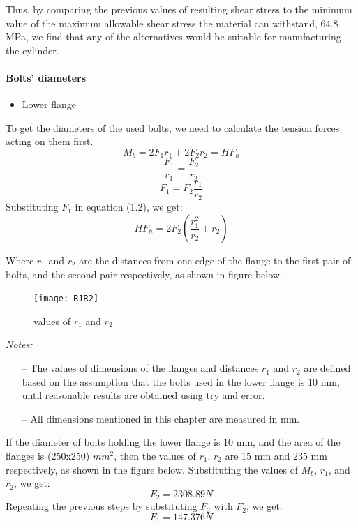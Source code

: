 Thus, by comparing the previous values of resulting shear stress to the minimum value of the maximum allowable shear stress the material can withstand, 64.8 MPa, we find that any of the alternatives would be suitable for manufacturing the cylinder.

\bigskip

\paragraph{Bolts’ diameters}
\begin{itemize}
	\item Lower flange
\end{itemize}

To get the diameters of the used bolts, we need to calculate the tension forces acting on them first. 
\begin{equation}
M_{b} = 2 F_{1} r_{1} + 2 F_{2} r_{2} = H F_{h}
\end{equation}
$$\frac{F_{1}}{r_{1}} = \frac{F_{2}}{r_{2}}$$
$$ F_{1} = F_{2} \frac{r_{1}}{r_{2}}$$
Substituting $F_{1}$ in equation (1.2), we get:
\begin{equation}
H F_{h} = 2 F_{2} (\frac{r_{1}^{2}}{r_{2}} + r_{2})
\end{equation}

Where $r_{1}$ and $r_{2}$ are the distances from one edge of the flange to the first pair of bolts, and the second pair respectively, as shown in figure below.
\begin{figure}[H]
\begin{center}
	\texttt{[image: R1R2]}
	\caption{values of $r_{1}$ and $r_{2}$}
\end{center}	
\end{figure}

\textit{Notes:} 
\begin{itemize}	
\item[--]  The values of dimensions of the flanges and distances $r_{1}$ and $r_{2}$ are defined based on the assumption that the bolts used in the lower flange is 10 mm, until reasonable results are obtained using try and error.
\item[--] All dimensions mentioned in this chapter are measured in mm.
\end{itemize}



If the diameter of bolts holding the lower flange is 10 mm, and the area of the flanges is (250x250) $mm^{2}$, then the values of $r_{1}$, $r_{2}$ are 15 mm and 235 mm respectively, as shown in the figure below.
\newline Substituting the values of $M_{b}$, $r_{1}$, and $r_{2}$, we get:
$$ F_{2} = 2308.89 N $$
Repeating the previous steps by substituting $F_{2}$ with $F_{2}$, we get:
$$ F_{1} = 147.376 N $$

